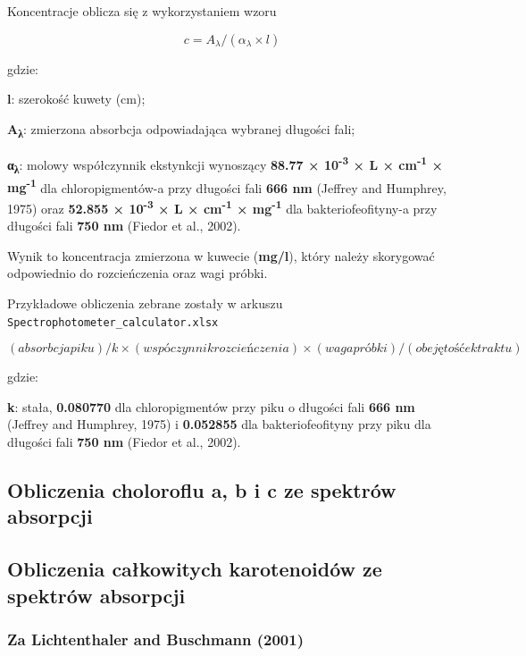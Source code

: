 \documentclass[
  letterpaper,
  DIV=11,
  numbers=noendperiod]{scrreprt}
\begin{document}
Koncentracje oblicza się z wykorzystaniem wzoru

\[
c = A_λ / (α_λ × l)
\]

gdzie:

\textbf{l}: szerokość kuwety (cm);

\textbf{A\textsubscript{λ}}: zmierzona absorbcja odpowiadająca wybranej
długości fali;

\textbf{α\textsubscript{λ}}: molowy współczynnik ekstynkcji wynoszący
\textbf{88.77 × 10\textsuperscript{-3} × L × cm\textsuperscript{-1} ×
mg\textsuperscript{-1}} dla chloropigmentów-a przy długości fali
\textbf{666 nm} (Jeffrey and Humphrey, 1975) oraz \textbf{52.855 ×
10\textsuperscript{-3} × L × cm\textsuperscript{-1} ×
mg\textsuperscript{-1}} dla bakteriofeofityny-a przy długości fali
\textbf{750 nm} (Fiedor et al., 2002).

Wynik to koncentracja zmierzona w kuwecie (\textbf{mg/l}), który należy
skorygować odpowiednio do rozcieńczenia oraz wagi próbki.

Przykładowe obliczenia zebrane zostały w arkuszu
\texttt{Spectrophotometer\_calculator.xlsx}

\[
(absorbcja piku) / k × (wspóczynnik rozcieńczenia) × (waga próbki) / (obejętość ektraktu)
\]

gdzie:

\textbf{k}: stała, \textbf{0.080770} dla chloropigmentów przy piku o
długości fali \textbf{666 nm} (Jeffrey and Humphrey, 1975) i
\textbf{0.052855} dla bakteriofeofityny przy piku dla długości fali
\textbf{750 nm} (Fiedor et al., 2002).

\hypertarget{obliczenia-choloroflu-a-b-i-c-ze-spektruxf3w-absorpcji}{%
\subsection{Obliczenia choloroflu a, b i c ze spektrów
absorpcji}\label{obliczenia-choloroflu-a-b-i-c-ze-spektruxf3w-absorpcji}}

\hypertarget{obliczenia-caux142kowitych-karotenoiduxf3w-ze-spektruxf3w-absorpcji}{%
\subsection{Obliczenia całkowitych karotenoidów ze spektrów
absorpcji}\label{obliczenia-caux142kowitych-karotenoiduxf3w-ze-spektruxf3w-absorpcji}}

\hypertarget{za-lichtenthaler-and-buschmann-2001}{%
\subsubsection{Za Lichtenthaler and Buschmann
(2001)}\label{za-lichtenthaler-and-buschmann-2001}}
\end{document}
